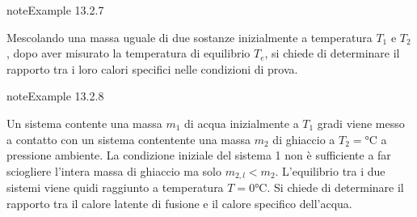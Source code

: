\documentclass[letterpaper,10pt,italian]{jupyterBook}
\begin{document}
\begin{sphinxadmonition}{note}{Example 13.2.7}



\sphinxAtStartPar
Mescolando una massa uguale di due sostanze inizialmente a temperatura \(T_1\)  e \(T_2\), dopo aver misurato la temperatura di equilibrio \(T_e\), si chiede di determinare il rapporto tra i loro calori specifici nelle condizioni di prova.
\end{sphinxadmonition}
\label{ch/thermodynamics/foundation-experiments:thermodynamics:history:heat-capacity:4}
\begin{sphinxadmonition}{note}{Example 13.2.8}



\sphinxAtStartPar
Un sistema contente una massa \(m_1\) di acqua inizialmente a \(T_1\) gradi viene messo a contatto con un sistema contentente una massa \(m_2\) di ghiaccio a \(T_2 = \text{°C}\) a pressione ambiente. La condizione iniziale del sistema 1 non è sufficiente a far sciogliere l’intera massa di ghiaccio ma solo \(m_{2,l} < m_2\). L’equilibrio tra i due sistemi viene quidi raggiunto a temperatura \(T=0 \text{°C}\). Si chiede di determinare il rapporto tra il calore latente di fusione e il calore specifico dell’acqua.
\end{sphinxadmonition}
\label{ch/thermodynamics/foundation-experiments:thermodynamics:history:heat-capacity:unit}
\end{document}
